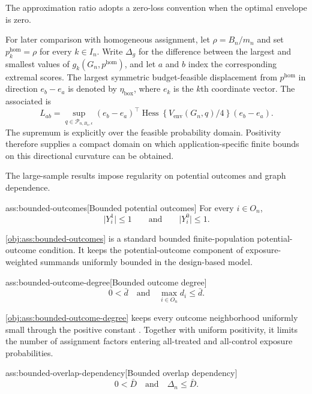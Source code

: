 The approximation ratio  adopts a zero-loss convention when the optimal envelope is zero.

For later comparison with homogeneous assignment, let \(\rho=B_n/m_n\) and set \(p_k^{\mathrm{hom}}=\rho\) for every \(k\in I_n\). Write \(\Delta_g\) for the difference between the largest and smallest values of \(g_k(G_n,p^{\mathrm{hom}})\), and let \(a\) and \(b\) index the corresponding extremal scores. The largest symmetric budget-feasible displacement from \(p^{\mathrm{hom}}\) in direction \(e_b-e_a\) is denoted by \(\eta_{\mathrm{box}}\), where \(e_k\) is the \(k\)th coordinate vector. The associated  is
\[
L_{ab}
=
\sup_{q\in\mathcal P_{n,B_n,\epsilon}}
(e_b-e_a)^\top
\operatorname{Hess}\!\left\{V_{\mathrm{env}}(G_n,q)/4\right\}
(e_b-e_a).
\]
The supremum is explicitly over the feasible probability domain. Positivity therefore supplies a compact domain on which application-specific finite bounds on this directional curvature can be obtained.

The large-sample results impose regularity on potential outcomes and graph dependence.

\begin{assumptionv}{ass:bounded-outcomes}[Bounded potential outcomes]
For every $i\in O_n$,
\[
\lvert Y_i^1\rvert\leq 1
\qquad\text{and}\qquad
\lvert Y_i^0\rvert\leq 1.
\]
\end{assumptionv}

\cref{obj:ass:bounded-outcomes} is a standard bounded finite-population potential-outcome condition. It keeps the potential-outcome component of exposure-weighted summands uniformly bounded in the design-based model.

\begin{assumptionv}{ass:bounded-outcome-degree}[Bounded outcome degree]
\[
0 < \bar d
\quad\text{and}\quad
\max_{i\in O_n} d_i \leq \bar d.
\]
\end{assumptionv}

\cref{obj:ass:bounded-outcome-degree} keeps every outcome neighborhood uniformly small through the positive constant . Together with uniform positivity, it limits the number of assignment factors entering all-treated and all-control exposure probabilities.

\begin{assumptionv}{ass:bounded-overlap-dependency}[Bounded overlap dependency]
\[
0 < \bar D \quad\text{and}\quad \Delta_n \le \bar D.
\]
\end{assumptionv}

